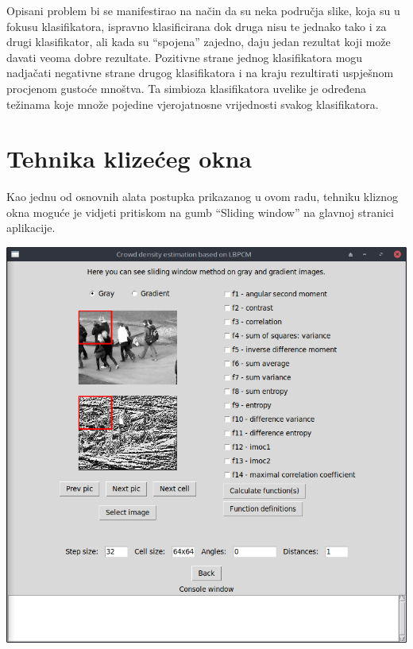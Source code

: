 \documentclass[times, utf8, zavrsni]{fer}
\begin{document}
Opisani problem bi se manifestirao na način da su neka 
područja slike, koja su u fokusu klasifikatora, ispravno klasificirana 
dok druga nisu te jednako tako i za drugi klasifikator, ali kada
su \enquote{spojena} zajedno, daju jedan rezultat koji može davati veoma
dobre rezultate. Pozitivne strane jednog klasifikatora mogu nadjačati 
negativne strane drugog klasifikatora i na kraju rezultirati uspješnom
procjenom gustoće mnoštva. Ta simbioza klasifikatora uvelike je određena 
težinama koje množe pojedine vjerojatnosne vrijednosti svakog klasifikatora.


\chapter{Tehnika klizećeg okna}

Kao jednu od osnovnih alata postupka prikazanog u ovom radu, tehniku
kliznog okna moguće je vidjeti pritiskom na gumb \enquote{Sliding window}
na glavnoj stranici aplikacije. 

\bigbreak

\begin{minipage}{\linewidth}
\centering
\includegraphics[scale=0.4]{img/sw1.png}
\end{minipage}

\bigbreak
\end{document}
